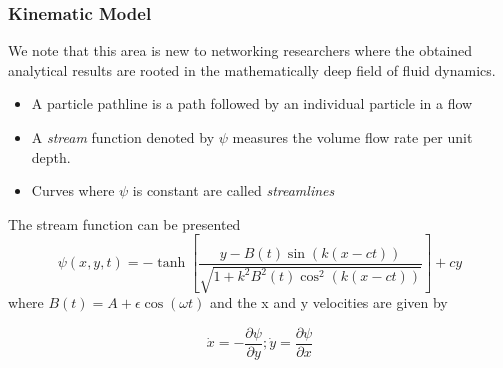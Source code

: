 \documentclass{beamer}
\begin{document}
\begin{frame}
\frametitle{Kinematic Model}
We note that this area is new to networking researchers where the obtained analytical
results are rooted in the mathematically deep field of fluid dynamics.
\begin{itemize}
\item A particle pathline is a path followed by an individual particle in a flow
\item A \textit{stream} function denoted  by $\psi$ measures the volume flow rate per unit depth.
\item Curves where $\psi$ is constant are called \textit{streamlines}
\end{itemize}
The stream function can be presented \\
\begin{equation}\label{eq:sf}
\psi(x,y,t)=-\tanh{[\frac{y-B(t)\sin(k(x-ct))}{\sqrt{1 + k^2 B^2(t) \cos^2(k(x-ct))}} ]} + cy
\end{equation}
 where $  B(t) = A + \epsilon \cos(\omega t)$  and the x and y velocities are given by
 
 \begin{equation}\label{eq:lf}
\dot{x}=-\frac{\partial \psi}{\partial y} ; \dot{y}=\frac{\partial \psi}{\partial x}
\end{equation}
\end{frame}
\end{document}
